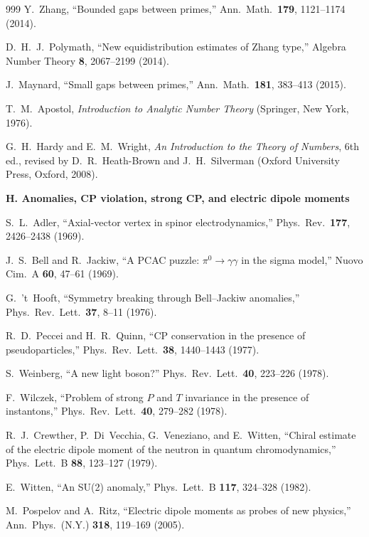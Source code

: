 \begin{thebibliography}{999}
Y.~Zhang,
``Bounded gaps between primes,''
Ann.\ Math.\ \textbf{179}, 1121--1174 (2014).

D.~H.~J.~Polymath,
``New equidistribution estimates of Zhang type,''
Algebra Number Theory \textbf{8}, 2067--2199 (2014).

J.~Maynard,
``Small gaps between primes,''
Ann.\ Math.\ \textbf{181}, 383--413 (2015).

T.~M.~Apostol,
\emph{Introduction to Analytic Number Theory}
(Springer, New York, 1976).

G.~H.~Hardy and E.~M.~Wright,
\emph{An Introduction to the Theory of Numbers}, 6th ed., revised by
D.~R.~Heath-Brown and J.~H.~Silverman
(Oxford University Press, Oxford, 2008).

\item[]\textbf{H. Anomalies, CP violation, strong CP, and electric dipole moments}

S.~L.~Adler,
``Axial-vector vertex in spinor electrodynamics,''
Phys.\ Rev.\ \textbf{177}, 2426--2438 (1969).

J.~S.~Bell and R.~Jackiw,
``A PCAC puzzle: $\pi^0\to\gamma\gamma$ in the sigma model,''
Nuovo Cim.\ A \textbf{60}, 47--61 (1969).

G.~'t~Hooft,
``Symmetry breaking through Bell--Jackiw anomalies,''
Phys.\ Rev.\ Lett.\ \textbf{37}, 8--11 (1976).

R.~D.~Peccei and H.~R.~Quinn,
``CP conservation in the presence of pseudoparticles,''
Phys.\ Rev.\ Lett.\ \textbf{38}, 1440--1443 (1977).

S.~Weinberg,
``A new light boson?'' Phys.\ Rev.\ Lett.\ \textbf{40}, 223--226 (1978).

F.~Wilczek,
``Problem of strong $P$ and $T$ invariance in the presence of instantons,''
Phys.\ Rev.\ Lett.\ \textbf{40}, 279--282 (1978).

R.~J.~Crewther, P.~Di~Vecchia, G.~Veneziano, and E.~Witten,
``Chiral estimate of the electric dipole moment of the neutron in quantum
chromodynamics,'' Phys.\ Lett.\ B \textbf{88}, 123--127 (1979).

E.~Witten,
``An SU(2) anomaly,'' Phys.\ Lett.\ B \textbf{117}, 324--328 (1982).

M.~Pospelov and A.~Ritz,
``Electric dipole moments as probes of new physics,''
Ann.\ Phys.\ (N.Y.) \textbf{318}, 119--169 (2005).


\end{thebibliography}
